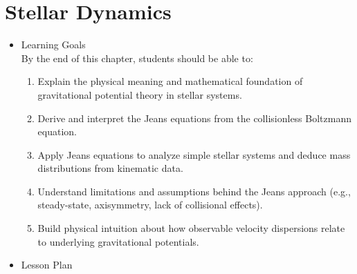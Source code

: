 \chapter{Stellar Dynamics}


\begin{itemize}
\item Learning Goals\\
  By the end of this chapter, students should be able to:

\begin{enumerate}
  \item Explain the physical meaning and mathematical foundation of gravitational potential theory in stellar systems.
  \item Derive and interpret the Jeans equations from the collisionless Boltzmann equation.
  \item Apply Jeans equations to analyze simple stellar systems and deduce mass distributions from kinematic data.
  \item Understand limitations and assumptions behind the Jeans approach (e.g., steady-state, axisymmetry, lack of collisional effects).
  \item Build physical intuition about how observable velocity dispersions relate to underlying gravitational potentials.
\end{enumerate}


\item Lesson Plan

  \begin{enumerate}


\end{enumerate}
\end{itemize}
